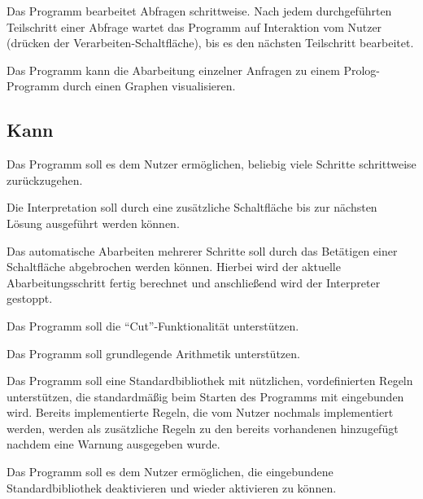 \documentclass[parskip=full,11pt,twoside]{scrartcl}
\begin{document}
Das Programm bearbeitet Abfragen schrittweise. Nach jedem durchgeführten Teilschritt einer Abfrage wartet das Programm auf Interaktion vom Nutzer (drücken der Verarbeiten-Schaltfläche), bis es den nächsten Teilschritt bearbeitet.


Das Programm kann die Abarbeitung einzelner Anfragen zu einem Prolog-Programm durch einen Graphen visualisieren.

\subsection{Kann}


Das Programm soll es dem Nutzer ermöglichen, beliebig viele Schritte schrittweise zurückzugehen.


Die Interpretation soll durch eine zusätzliche Schaltfläche bis zur nächsten Lösung ausgeführt werden können.


Das automatische Abarbeiten mehrerer Schritte soll durch das Betätigen einer Schaltfläche abgebrochen werden können. Hierbei wird der aktuelle Abarbeitungsschritt fertig berechnet und anschließend wird der Interpreter gestoppt.


Das Programm soll die \enquote{Cut}-Funktionalität unterstützen.


Das Programm soll grundlegende Arithmetik unterstützen.


Das Programm soll eine Standardbibliothek mit nützlichen, vordefinierten Regeln unterstützen, die standardmäßig beim Starten des Programms mit eingebunden wird. Bereits implementierte Regeln, die vom Nutzer nochmals implementiert werden, werden als zusätzliche Regeln zu den bereits vorhandenen hinzugefügt nachdem eine Warnung ausgegeben wurde.


Das Programm soll es dem Nutzer ermöglichen, die eingebundene Standardbibliothek deaktivieren und wieder aktivieren zu können.
\end{document}
